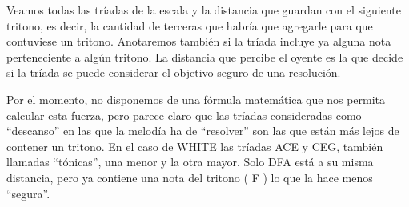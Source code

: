 \documentclass[]{report}
\begin{document}
Veamos todas las tríadas de la escala y la distancia que guardan con el siguiente tritono, es decir, la cantidad de terceras que habría que agregarle para que contuviese un tritono. Anotaremos también si la tríada incluye ya alguna nota perteneciente a algún tritono. La distancia que percibe el oyente es la que decide si la tríada se puede considerar el objetivo seguro de una resolución. 

Por el momento, no disponemos de una fórmula matemática que nos permita calcular esta fuerza, pero parece claro que las tríadas consideradas como ``descanso'' en las que la melodía ha de ``resolver'' son las que están más lejos de contener un tritono. En el caso de \textsf{WHITE} las tríadas \textsf{ACE} y \textsf{CEG}, también llamadas ``tónicas'', una menor y la otra mayor. Solo \textsf{DFA} está a su misma distancia, pero ya contiene una nota del tritono ( \textsf{F} ) lo que la hace menos ``segura''.
\end{document}
